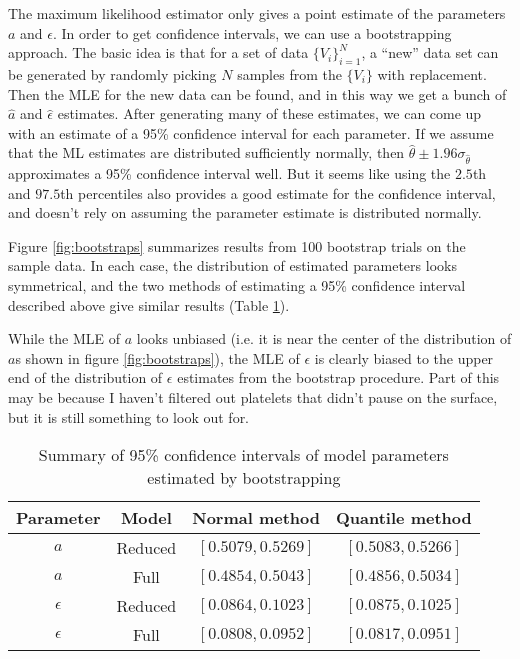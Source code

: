 \documentclass{article}
\begin{document}
The maximum likelihood estimator only gives a point estimate of the
parameters $a$ and $\epsilon$. In order to get confidence intervals,
we can use a bootstrapping approach. The basic idea is that for a set
of data $\{V_i\}_{i=1}^N$, a ``new'' data set can be generated by
randomly picking $N$ samples from the $\{V_i\}$ with replacement. Then
the MLE for the new data can be found, and in this way we get a bunch
of $\hat{a}$ and $\hat{\epsilon}$ estimates. After generating many of
these estimates, we can come up with an estimate of a 95\% confidence
interval for each parameter. If we assume that the ML estimates are
distributed sufficiently normally, then
$\hat{\theta} \pm 1.96 \sigma_{\hat{\theta}}$ approximates a 95\%
confidence interval well. But it seems like using the $2.5$th and
$97.5$th percentiles also provides a good estimate for the confidence
interval, and doesn't rely on assuming the parameter estimate is
distributed normally.

Figure \ref{fig:bootstraps} summarizes results from 100 bootstrap
trials on the sample data. In each case, the distribution of estimated
parameters looks symmetrical, and the two methods of estimating a 95\%
confidence interval described above give similar results (Table
\ref{tab:conf-int}).

While the MLE of $a$ looks unbiased (i.e. it is near the center of the
distribution of $a$s shown in figure \ref{fig:bootstraps}), the MLE of
$\epsilon$ is clearly biased to the upper end of the distribution of
$\epsilon$ estimates from the bootstrap procedure. Part of this may be
because I haven't filtered out platelets that didn't pause on the
surface, but it is still something to look out for. 

\begin{table}
  \centering
  \begin{tabular}{cccc}
    \hline
    Parameter & Model & Normal method & Quantile method \\
    \hline
    $a$ & Reduced & $[0.5079, 0.5269]$ & $[0.5083, 0.5266]$ \\
    $a$ & Full & $[0.4854, 0.5043]$ & $[0.4856, 0.5034]$ \\
    $\epsilon$ & Reduced & $[0.0864, 0.1023]$ & $[0.0875, 0.1025]$ \\
    $\epsilon$ & Full & $[0.0808, 0.0952]$ & $[0.0817, 0.0951]$\\
    \hline
  \end{tabular}
  \caption[Summary of confidence intervals]{Summary of 95\% confidence
    intervals of model parameters estimated by bootstrapping}
  \label{tab:conf-int}
\end{table}
\end{document}
